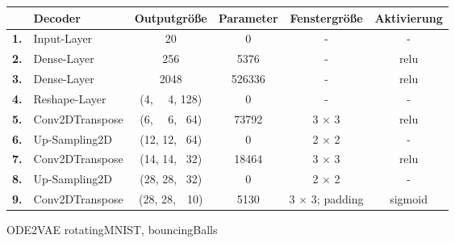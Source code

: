 \documentclass[12pt]{article}
\begin{document}
	\begin{table}[htb]
		\begin{center}
			\begin{tabular}{llcccc}\toprule
				\textbf{\ }	&\textbf{Decoder}	&\textbf{Outputgröße} &\textbf{Parameter} &\textbf{Fenstergröße} &\textbf{Aktivierung}\\
				\midrule
				\textbf{1.}	&Input-Layer	& 20		& 0		& - 			&- \\
				\textbf{2.}	&Dense-Layer 			& 256		& 5376	& -				&relu \\
				\textbf{3.}	&Dense-Layer			& 2048		& 526336& -				&relu \\
				\textbf{4.}	&Reshape-Layer		& (4, \ \ 4,  128)	& 0		& -		&- \\
				\textbf{5.}	&Conv2DTranspose& (6, \ \ 6, \ 64)	& 73792	& 3 $\times$ 3 	&relu \\
				\textbf{6.}	&Up-Sampling2D	& (12, 12, \ 64)	& 0		& 2 $\times$ 2 	&- \\
				\textbf{7.}	&Conv2DTranspose& (14, 14, \ 32)	& 18464		& 3 $\times$ 3 			&relu \\
				\textbf{8.}	&Up-Sampling2D	& (28, 28, \ 32)	& 0	& 2 $\times$ 2 			&- \\
				\textbf{9.}	&Conv2DTranspose& (28, 28,\ \ 10)	& 5130  	& 3 $\times$ 3; padding 			&sigmoid \\
				\bottomrule
			\end{tabular}
		\end{center}
	\end{table}
	ODE2VAE rotatingMNIST, bouncingBalls
\end{document}
